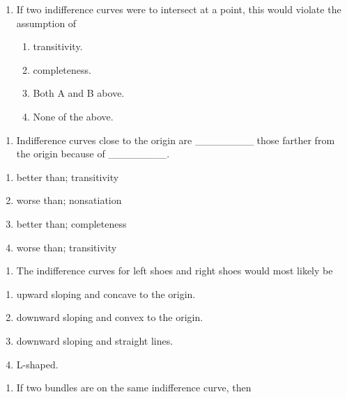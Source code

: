 \documentclass[11pt,]{article}
\providecommand{\tightlist}{%
  \setlength{\itemsep}{0pt}\setlength{\parskip}{0pt}}
\begin{document}
\begin{enumerate}
\def\labelenumi{\arabic{enumi})}
\setcounter{enumi}{8}
\tightlist
\item
  If two indifference curves were to intersect at a point, this would
  violate the assumption of

  \begin{enumerate}
  \def\labelenumii{\Alph{enumii})}
  \tightlist
  \item
    transitivity.
  \item
    completeness.
  \item
    Both A and B above.
  \item
    None of the above.
  \end{enumerate}
\end{enumerate}

\begin{enumerate}
\def\labelenumi{\arabic{enumi})}
\setcounter{enumi}{9}
\tightlist
\item
  Indifference curves close to the origin are \_\_\_\_\_\_\_\_ those
  farther from the origin because of \_\_\_\_\_\_\_\_.
\end{enumerate}

\begin{enumerate}
\def\labelenumi{\Alph{enumi})}
\tightlist
\item
  better than; transitivity
\item
  worse than; nonsatiation
\item
  better than; completeness
\item
  worse than; transitivity
\end{enumerate}

\begin{enumerate}
\def\labelenumi{\arabic{enumi})}
\setcounter{enumi}{10}
\tightlist
\item
  The indifference curves for left shoes and right shoes would most
  likely be
\end{enumerate}

\begin{enumerate}
\def\labelenumi{\Alph{enumi})}
\tightlist
\item
  upward sloping and concave to the origin.
\item
  downward sloping and convex to the origin.
\item
  downward sloping and straight lines.
\item
  L-shaped.
\end{enumerate}

\begin{enumerate}
\def\labelenumi{\arabic{enumi})}
\setcounter{enumi}{11}
\tightlist
\item
  If two bundles are on the same indifference curve, then
\end{enumerate}
\end{document}
